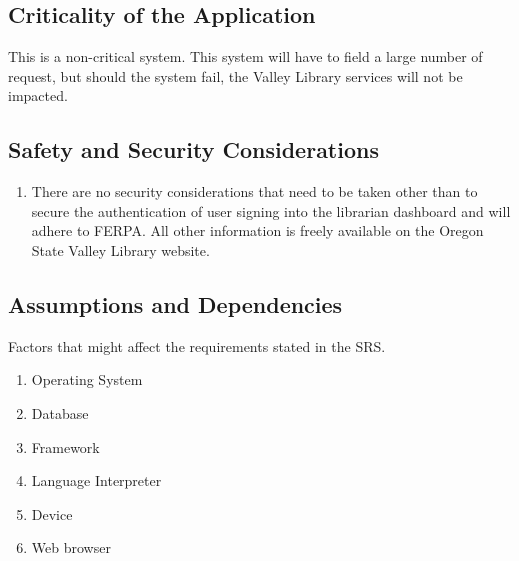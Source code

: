 \documentclass[letterpaper,10pt,titlepage, onecolumn, compsoc]{IEEEtran}
\begin{document}

\subsection{Criticality of the Application}
This is a non-critical system. This system will have to field a large number of request, but should the system fail,  the Valley Library services will not be impacted.

\subsection{Safety and Security Considerations}
\begin{enumerate}
	\item There are no security considerations that need to be taken other than to secure the authentication of user signing into the librarian dashboard and will adhere to FERPA. All other information is freely available on the Oregon State Valley Library website. 
\end{enumerate}

\subsection{Assumptions and Dependencies}
Factors that might affect the requirements stated in the SRS.
\begin{enumerate}
	\item Operating System
    \item Database
    \item Framework
    \item Language Interpreter
    \item Device
    \item Web browser
\end{enumerate}


\end{document}
